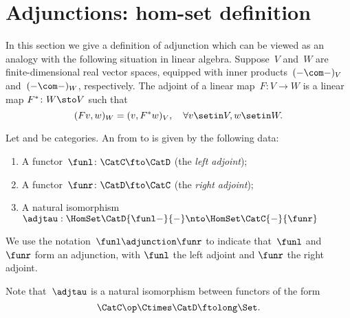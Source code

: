 

\section{Adjunctions: hom-set definition}
In this section we give a definition of adjunction which can be viewed as an analogy with the following situation in linear algebra.
Suppose~$V$ and~$W$ are finite-dimensional real vector spaces, equipped with inner products~$(-\com -)_V$ and~$(- \com -)_W$, respectively.
The adjoint of a linear map~$F\colon V \to W$ is a linear map $F^*\colon W \sto V$ such that
\begin{equation*}
    (Fv, w)
    _W = (v, F^*w)_V, \quad \forall v \setin V, w \setin W.
\end{equation*}

\begin{ctdefinition}
    \label{def:adj-iso}
    \label{def:cat-adjunction-v1}
    Let \CatC and \CatD be categories.
    An \emph{} from \CatC to \CatD is given by the following data:
    \begin{enumerate}
        \item A functor~$\funl\colon \CatC \fto \CatD$ (the \emph{left adjoint});
        \item A functor~$\funr\colon \CatD \fto \CatC$ (the \emph{right adjoint});
        \item A natural isomorphism~$\adjtau: \HomSet\CatD{\funl -}{-} \nto \HomSet\CatC{-}{\funr}$
    \end{enumerate}
    We use the notation~$\funl \adjunction  \funr$ to indicate that~$\funl$ and~$\funr$ form an adjunction, with $\funl$ the left adjoint and $\funr$ the right adjoint.
\end{ctdefinition}

\begin{remark}
    Note that~$\adjtau$ is a natural isomorphism between functors of the form
    \begin{equation}
        \CatC\op \Ctimes \CatD \ftolong   \Set.
    \end{equation}
\end{remark}

